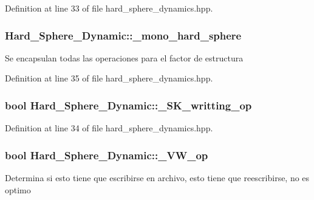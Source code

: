 Definition at line 33 of file hard\+\_\+sphere\+\_\+dynamics.\+hpp.

\subsubsection[{\texorpdfstring{\+\_\+mono\+\_\+hard\+\_\+sphere}{_mono_hard_sphere}}]{ Hard\+\_\+\+Sphere\+\_\+\+Dynamic\+::\+\_\+mono\+\_\+hard\+\_\+sphere\hspace{0.3cm}{\ttfamily [protected]}}\hypertarget{class_hard___sphere___dynamic_a35022dac6e1ca069c2125cc2724827ae}{}\label{class_hard___sphere___dynamic_a35022dac6e1ca069c2125cc2724827ae}
Se encapsulan todas las operaciones para el factor de estructura 

Definition at line 35 of file hard\+\_\+sphere\+\_\+dynamics.\+hpp.

\subsubsection[{\texorpdfstring{\+\_\+\+S\+K\+\_\+writting\+\_\+op}{_SK_writting_op}}]{\setlength{\rightskip}{0pt plus 5cm}bool Hard\+\_\+\+Sphere\+\_\+\+Dynamic\+::\+\_\+\+S\+K\+\_\+writting\+\_\+op\hspace{0.3cm}{\ttfamily [protected]}}\hypertarget{class_hard___sphere___dynamic_ae761d6f2670d1f849e13f0d1d50d1db5}{}\label{class_hard___sphere___dynamic_ae761d6f2670d1f849e13f0d1d50d1db5}


Definition at line 34 of file hard\+\_\+sphere\+\_\+dynamics.\+hpp.

\subsubsection[{\texorpdfstring{\+\_\+\+V\+W\+\_\+op}{_VW_op}}]{\setlength{\rightskip}{0pt plus 5cm}bool Hard\+\_\+\+Sphere\+\_\+\+Dynamic\+::\+\_\+\+V\+W\+\_\+op\hspace{0.3cm}{\ttfamily [protected]}}\hypertarget{class_hard___sphere___dynamic_a057b063e3d733b1fb4b90cfe09f13238}{}\label{class_hard___sphere___dynamic_a057b063e3d733b1fb4b90cfe09f13238}
Determina si esto tiene que escribirse en archivo, esto tiene que reescribirse, no es optimo 

